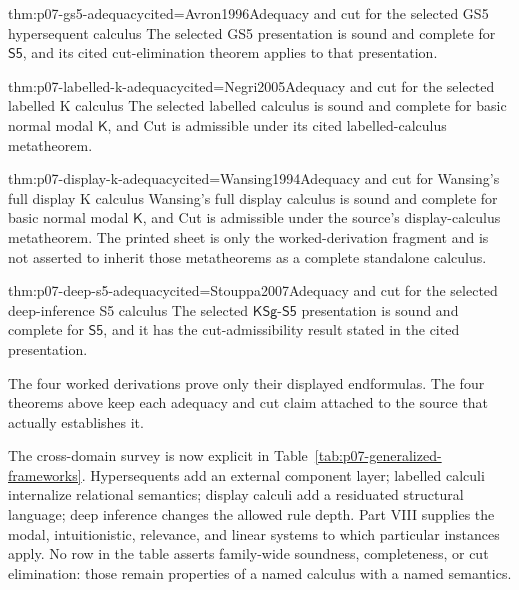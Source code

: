 \begin{hbtheorem}{thm:p07-gs5-adequacy}{cited=Avron1996}{Adequacy and cut for the selected GS5 hypersequent calculus}
The selected GS5 presentation is sound and complete for \(\mathsf{S5}\), and
its cited cut-elimination theorem applies to that presentation.
\end{hbtheorem}

\begin{hbtheorem}{thm:p07-labelled-k-adequacy}{cited=Negri2005}{Adequacy and cut for the selected labelled K calculus}
The selected labelled calculus is sound and complete for basic normal modal
\(\mathsf K\), and Cut is admissible under its cited labelled-calculus
metatheorem.
\end{hbtheorem}

\begin{hbtheorem}{thm:p07-display-k-adequacy}{cited=Wansing1994}{Adequacy and cut for Wansing's full display K calculus}
Wansing's full display calculus is sound and complete for basic normal modal
\(\mathsf K\), and Cut is admissible under the source's display-calculus
metatheorem.  The printed sheet is only the worked-derivation fragment and is
not asserted to inherit those metatheorems as a complete standalone calculus.
\end{hbtheorem}

\begin{hbtheorem}{thm:p07-deep-s5-adequacy}{cited=Stouppa2007}{Adequacy and cut for the selected deep-inference S5 calculus}
The selected \(\mathsf{KSg\mbox{-}S5}\) presentation is sound and complete for
\(\mathsf{S5}\), and it has the cut-admissibility result stated in the cited
presentation.
\end{hbtheorem}

The four worked derivations prove only their displayed endformulas.  The four
theorems above keep each adequacy and cut claim attached to the source that
actually establishes it.

The cross-domain survey is now explicit in
Table~\ref{tab:p07-generalized-frameworks}. Hypersequents add an external
component layer; labelled calculi internalize relational semantics; display
calculi add a residuated structural language; deep inference changes the
allowed rule depth. Part VIII supplies the modal, intuitionistic, relevance,
and linear systems to which particular instances apply. No row in the table
asserts family-wide soundness, completeness, or cut elimination: those remain
properties of a named calculus with a named semantics.

